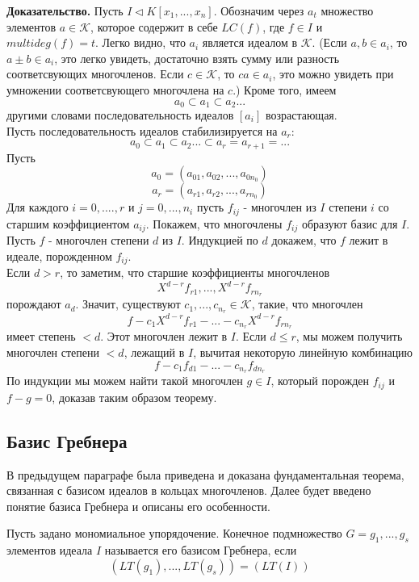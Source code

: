\textbf{Доказательство.} 
Пусть $I \triangleleft K \left[ x_{1}, ... , x_{n} \right]$. Обозначим через $a_{t}$ множество элементов $a \in \mathcal{K}$, которое содержит в себе $LC(f)$, где $f \in I$ и $ multideg(f) = t $.
Легко видно, что $a_{i}$ является идеалом в $ \mathcal{K} $. (Если $a,b \in a_{i}$, то $ a \pm b \in a_{i}$, это легко увидеть, достаточно взять сумму или разность соответсвующих многочленов. Если $ c \in \mathcal{K}$, то $ca \in a_{i}$, это можно увидеть при умножении соответсвующего многочлена на $c$.)
Кроме того, имеем $$ a_{0} \subset a_{1} \subset a_{2} ... $$
другими словами последовательность идеалов $\left[ a_{i} \right]$ возрастающая. 
\\Пусть последовательность идеалов стабилизируется на $a_{r}$:
$$ a_{0} \subset a_{1} \subset a_{2} ... \subset a_{r} = a_{r+1} = ...$$
Пусть 
$$  a_{0}  = (a_{01}, a_{02}, ..., a_{0n_{0}})$$
$$  a_{r}  = (a_{r1}, a_{r2}, ..., a_{rn_{0}})$$
Для каждого $ i = 0, ...., r$ и $j = 0, ..., n_{i}$ пусть $f_{ij}$ - многочлен из $I$ степени $i$ со старшим коэффициентом $a_{ij}$. Покажем, что многочлены $f_{ij}$ образуют базис для $I$.
\\ Пусть $f$ - многочлен степени $d$ из $I$. Индукцией по $d$ докажем, что $f$ лежит в идеале, порожденном $f_{ij}$.
\\ Если $d > r$, то заметим, что старшие коэффициенты многочленов 
$$ X^{d-r}f_{r1}, ... , X^{d-r}f_{rn_{r}} $$
порождают $a_{d}$. Значит, существуют $ c_{1}, ... , c_{n_{r}} \in  \mathcal{K}$, такие, что многочлен
$$ f - c_{1}X^{d-r}f_{r1} - ... - c_{n_{r}}X^{d-r}f_{rn_{r}} $$
имеет степень $ < d$. Этот многочлен лежит в $I$.
Если $ d \leq r$, мы можем получить многочлен степени $ < d$, лежащий в $I$, вычитая некоторую линейную комбинацию
$$ f - c_{1}f_{d1} - ... - c_{n_{r}}f_{dn_{r}} $$
По индукции мы можем найти такой многочлен $g \in I$, который порожден $f_{ij}$ и $f - g = 0$, доказав таким образом теорему.

\subsection{Базис Гребнера}
В предыдущем параграфе была приведена и доказана фундаментальная теорема, связанная с базисом идеалов в кольцах многочленов.
Далее  будет введено понятие базиса Гребнера и описаны его особенности.

Пусть задано мономиальное упорядочение. Конечное подмножество $G = g_{1}, ... , g_{s}$ элементов идеала $I$ называется его базисом Гребнера, если 
$$ (LT(g_{1}), ..., LT(g_{s})) = ( LT(I) ) $$


